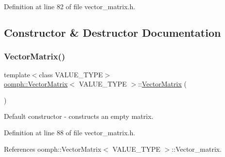 Definition at line 82 of file vector\+\_\+matrix.\+h.



\subsection{Constructor \& Destructor Documentation}
\mbox{\label{classoomph_1_1VectorMatrix_ab66eeed5c6d2f9a333890eaaf86def83}} 
\subsubsection{\texorpdfstring{Vector\+Matrix()}{VectorMatrix()}\hspace{0.1cm}{\footnotesize\ttfamily [1/3]}}
{\footnotesize\ttfamily template$<$class V\+A\+L\+U\+E\+\_\+\+T\+Y\+PE$>$ \\
\hyperlink{classoomph_1_1VectorMatrix}{oomph\+::\+Vector\+Matrix}$<$ V\+A\+L\+U\+E\+\_\+\+T\+Y\+PE $>$\+::\hyperlink{classoomph_1_1VectorMatrix}{Vector\+Matrix} (\begin{DoxyParamCaption}{ }\end{DoxyParamCaption})\hspace{0.3cm}{\ttfamily [inline]}}



Default constructor -\/ constructs an empty matrix. 



Definition at line 88 of file vector\+\_\+matrix.\+h.



References oomph\+::\+Vector\+Matrix$<$ V\+A\+L\+U\+E\+\_\+\+T\+Y\+P\+E $>$\+::\+Vector\+\_\+matrix.

\mbox{\label{classoomph_1_1VectorMatrix_a9e3f4fa81b91d802885c22a0595754c8}} 
